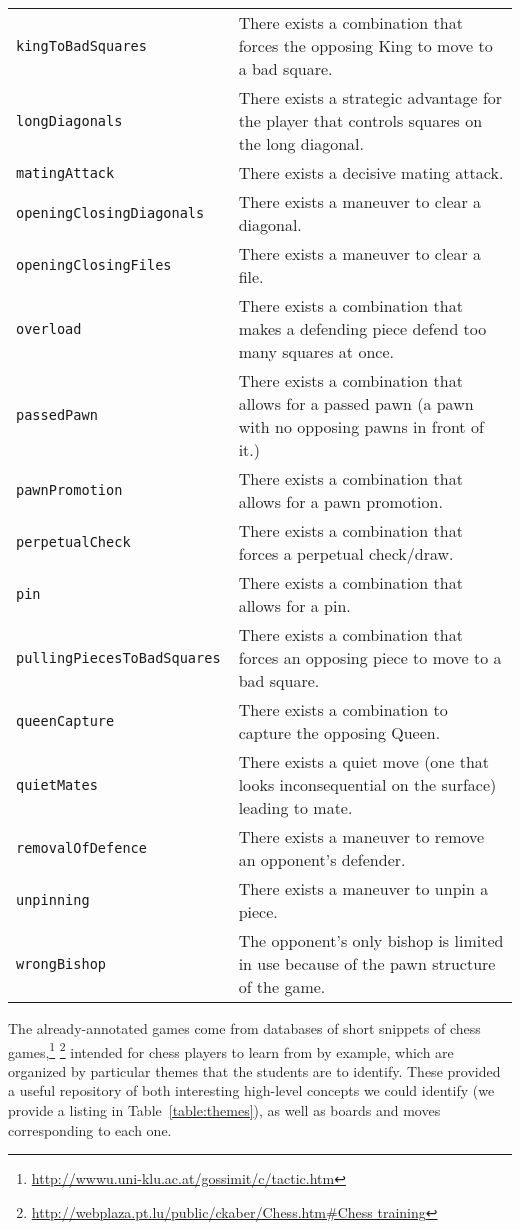 \documentclass[11pt]{article}
\begin{document}
\begin{table*}
\begin{tabular}{lp{}}
\tt{kingToBadSquares} & There exists a combination that forces the opposing King to move to a bad square. \\
\tt{longDiagonals} & There exists a strategic advantage for the player that controls squares on the long diagonal. \\
\tt{matingAttack} & There exists a decisive mating attack. \\
\tt{openingClosingDiagonals} & There exists a maneuver to clear a diagonal. \\
\tt{openingClosingFiles} & There exists a maneuver to clear a file. \\
\tt{overload} & There exists a combination that makes a defending piece defend too many squares at once. \\
\tt{passedPawn} & There exists a combination that allows for a passed pawn (a pawn with no opposing pawns in front of it.) \\
\tt{pawnPromotion} & There exists a combination that allows for a pawn promotion. \\
\tt{perpetualCheck} & There exists a combination that forces a perpetual check/draw. \\
\tt{pin} & There exists a combination that allows for a pin. \\
\tt{pullingPiecesToBadSquares} & There exists a combination that forces an opposing piece to move to a bad square. \\
\tt{queenCapture} & There exists a combination to capture the opposing Queen. \\
\tt{quietMates} & There exists a quiet move (one that looks inconsequential on the surface) leading to mate. \\
\tt{removalOfDefence} & There exists a maneuver to remove an opponent’s defender. \\
\tt{unpinning} & There exists a maneuver to unpin a piece. \\
\tt{wrongBishop} & The opponent’s only bishop is limited in use because of the pawn structure of the game. \\ \hline
\end{tabular}
\caption{List of high-level themes we attempt to automatically identify, along with explanations}
\label{table:themes}
\end{table*}

The already-annotated games come from databases of short snippets of chess games,\footnote{\url{http://wwwu.uni-klu.ac.at/gossimit/c/tactic.htm}} \footnote{\url{http://webplaza.pt.lu/public/ckaber/Chess.htm#Chess training}} intended for chess players to learn from by example, which are organized by particular themes that the students are to identify. These provided a useful repository of both interesting high-level concepts we could identify (we provide a listing in Table~\ref{table:themes}), as well as boards and moves corresponding to each one.
\end{document}
